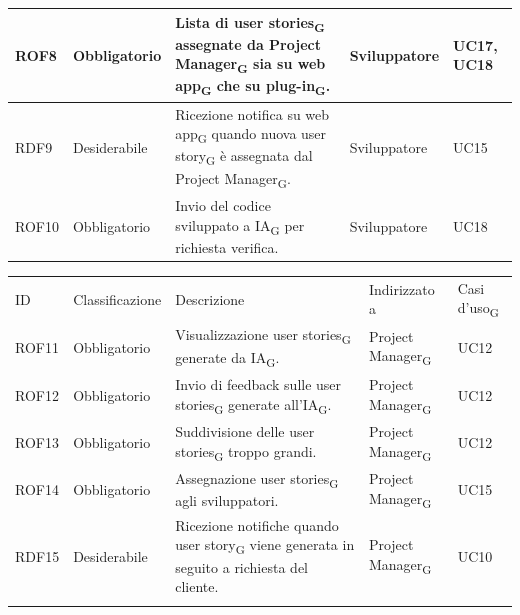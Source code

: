 \documentclass{article}
\begin{document}
\begin{center}
\begin{tabular}{|p{2cm}|p{3cm}|p{6cm}|p{3cm}|p{2cm}|}
ROF8&Obbligatorio & Lista di user stories\textsubscript{G} assegnate da Project Manager\textsubscript{G} sia su web app\textsubscript{G} che su plug-in\textsubscript{G}. & Sviluppatore & UC17, UC18\\
\hline
\rowcolor{LightBlue}

RDF9&Desiderabile & Ricezione notifica su web app\textsubscript{G} quando nuova user story\textsubscript{G} è assegnata dal Project Manager\textsubscript{G}.& Sviluppatore & UC15\\
\hline
\rowcolor{LighterBlue}
ROF10&Obbligatorio & Invio del codice sviluppato a IA\textsubscript{G} per richiesta verifica.& Sviluppatore & UC18\\

\hline
\end{tabular}

    \begin{tabular}{|p{2cm}|p{3cm}|p{6cm}|p{3cm}|p{2cm}|}
    \rowcolor{Blue} 
\hline
ID & Classificazione & Descrizione & Indirizzato a&Casi d'uso\textsubscript{G}  \\ 
\rowcolor{LighterBlue}

ROF11&Obbligatorio & Visualizzazione user stories\textsubscript{G} generate da IA\textsubscript{G}.  & Project Manager\textsubscript{G} & UC12\\
\hline



\rowcolor{LightBlue}
\hline
ROF12&Obbligatorio & Invio di feedback sulle user stories\textsubscript{G} generate all'IA\textsubscript{G}.& Project Manager\textsubscript{G}&UC12\\
\hline
\rowcolor{LighterBlue}

ROF13&Obbligatorio & Suddivisione delle user stories\textsubscript{G} troppo grandi.  & Project Manager\textsubscript{G}& UC12\\
\hline

\rowcolor{LightBlue}

ROF14&Obbligatorio & Assegnazione user stories\textsubscript{G} agli sviluppatori.& Project Manager\textsubscript{G}& UC15\\
\hline

\rowcolor{LighterBlue}

RDF15&Desiderabile & Ricezione notifiche quando user story\textsubscript{G} viene generata in seguito a richiesta del cliente. & Project Manager\textsubscript{G} & UC10\\
\hline

\rowcolor{LightBlue}


\end{tabular}
\end{center}
\end{document}
